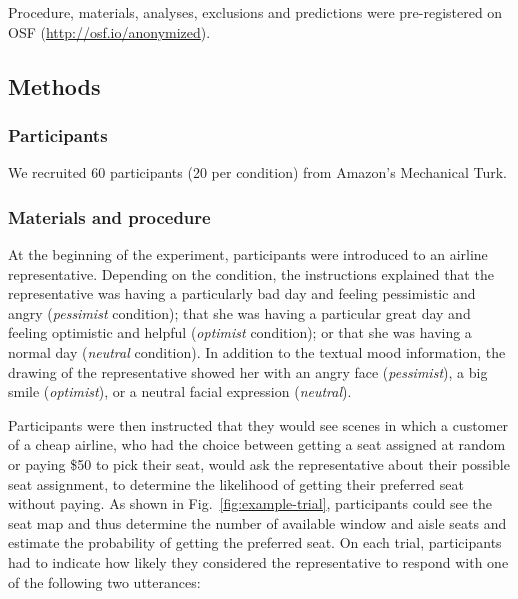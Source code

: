 Procedure, materials, analyses, exclusions and predictions were pre-registered on OSF (\url{http://osf.io/anonymized}).



\subsection{Methods}

\subsubsection{Participants} We recruited 60 participants (20 per condition) from Amazon's Mechanical Turk. 


\subsubsection{Materials and procedure}
At the beginning of the experiment, participants were introduced to an airline representative. Depending on the condition, the instructions explained that the representative was having a particularly bad day and feeling pessimistic and angry (\textit{pessimist} condition); that she was having a particular great day and feeling optimistic and helpful (\textit{optimist} condition); or that she was having a normal day (\textit{neutral} condition). In addition to the textual mood information, the drawing of the representative  showed her with an angry face (\textit{pessimist}), a big smile (\textit{optimist}), or a neutral facial expression (\textit{neutral}).

Participants were then instructed that they would see scenes in which a customer of a cheap airline, who had the choice between getting a seat assigned at random or paying \$50 to pick their seat, would ask the representative about their possible seat assignment, to determine the likelihood of getting their preferred seat without paying. As shown in Fig.~\ref{fig:example-trial}, participants could see the seat map and thus determine the number of available window and aisle seats and estimate the probability of getting the preferred seat. On each trial, participants had to indicate how likely they considered the representative to respond with one of the following two  utterances:

